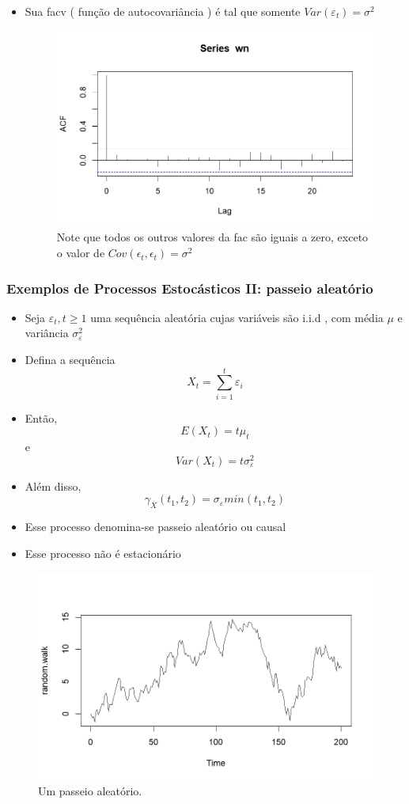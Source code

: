 \documentclass{beamer}
\begin{document}
\begin{frame}[allowframebreaks]
\begin{itemize}
	\item<1-> Sua facv ( função de autocovariância ) é tal que somente $Var(\varepsilon_{t}) = \sigma^{2}$
	\begin{figure}
		\centering
		\includegraphics[width=0.5\linewidth]{apresentacao_series_temporais/images/acf_wn}
		\caption[Função de Auto Covariância de um ruído branco]{Note que todos os outros valores da fac são iguais a zero, exceto o valor de $Cov(\epsilon_{t},\epsilon_{t})=\sigma^{2}$}
		\label{fig:acfwn}
	\end{figure}
	
	 
	\end{itemize}
\end{frame}

\begin{frame}[allowframebreaks]
	\frametitle{Exemplos de Processos Estocásticos II: passeio aleatório}
	\begin{itemize}
		\item<1->Seja $\varepsilon_{t}, t \geq 1$ uma sequência aleatória cujas variáveis são i.i.d , com média $\mu$ e variância $\sigma_{\varepsilon}^2$ 
		\item<1-> Defina a sequência \[X_{t} = \sum_{i=1}^{t}\varepsilon_{i}\] 
		\item<1-> Então, \[ E(X_{t}) = t\mu_{t} \] e \[ Var(X_{t}) = t \sigma_{\varepsilon}^{2}\]
		\item<1-> Além disso, \[ \gamma_{X}(t_{1},t_{2}) = \sigma_{\varepsilon} min(t_{1},t_{2})\]
		\item<1-> Esse processo denomina-se passeio aleatório ou causal
		\item<1-> Esse processo não é estacionário
	\end{itemize}
    \begin{figure}
    	\centering
    	\caption{Um passeio aleatório.}
    	\label{fig:random}
    	\includegraphics[width=0.7\linewidth]{apresentacao_series_temporais/images/random.walk}
    \end{figure}
    
\end{frame}
\end{document}
